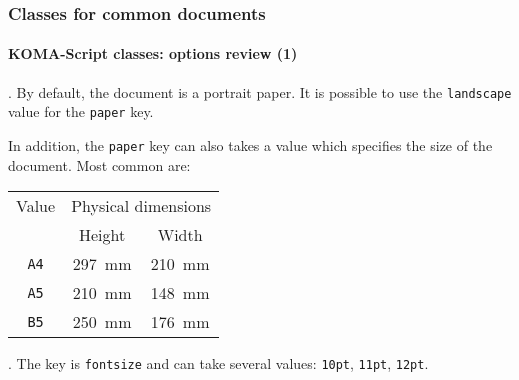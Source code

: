 \documentclass[11pt]{beamer}
\begin{document}
\begin{frame}[fragile]
	\frametitle{Classes for common documents}
	\framesubtitle{KOMA-Script classes: options review (1)}
	
	
	.
	By default, the document is a portrait paper. 
	It is possible to use the \texttt{landscape} value for the \texttt{paper} key.
	
	In addition, the \texttt{paper} key can also takes a value which specifies the size of the document.
	Most common are:
	\begin{table}[h]
		\begin{tabular}{*{3}{c}}
			\toprule
			    Value      & \multicolumn{2}{c}{Physical dimensions} \\
			\cmidrule{2-3} &    Height     &          Width          \\ \midrule
			 \texttt{A4}   & \SI{297}{\mm} &      \SI{210}{\mm}      \\
			 \texttt{A5}   & \SI{210}{\mm} &      \SI{148}{\mm}      \\
			 \texttt{B5}   & \SI{250}{\mm} &      \SI{176}{\mm}      \\ \bottomrule
		\end{tabular}
	\end{table}


	\vspace*{1ex}
	
	
	.
	The key is \texttt{fontsize} and can take several values: \texttt{10pt}, \texttt{11pt}, \texttt{12pt}.
\end{frame}
\end{document}
